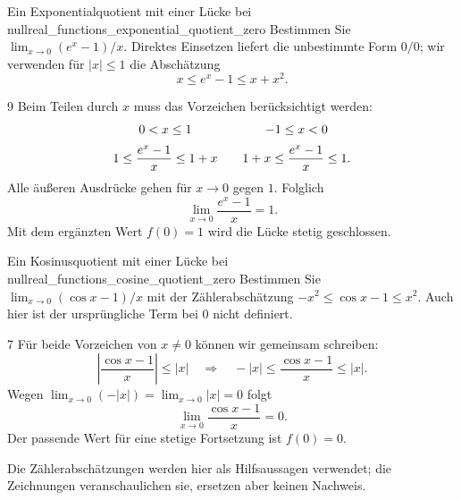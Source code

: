 \begin{ExampleBox}{Ein Exponentialquotient mit einer Lücke bei null}{real_functions_exponential_quotient_zero}
  Bestimmen Sie $\lim_{x\to0}(e^x-1)/x$. Direktes Einsetzen liefert
  die unbestimmte Form $0/0$; wir verwenden für $|x|\le1$ die Abschätzung
  \[
    x\le e^x-1\le x+x^2.
  \]
  \begin{center}
  \end{center}
  \begin{ClozeArea}[34]{9}
    Beim Teilen durch $x$ muss das Vorzeichen berücksichtigt werden:
    \[
      \begin{array}{c@{\qquad}c}
        0<x\le1&-1\le x<0\\[0.6em]
        1\le\dfrac{e^x-1}{x}\le1+x&
        1+x\le\dfrac{e^x-1}{x}\le1.
      \end{array}
    \]
    Alle äußeren Ausdrücke gehen für $x\to0$ gegen $1$. Folglich
    \[
      \lim_{x\to0}\frac{e^x-1}{x}=1.
    \]
    Mit dem ergänzten Wert $f(0)=1$ wird die Lücke stetig geschlossen.
  \end{ClozeArea}
\end{ExampleBox}
\begin{ExampleBox}{Ein Kosinusquotient mit einer Lücke bei null}{real_functions_cosine_quotient_zero}
  Bestimmen Sie $\lim_{x\to0}(\cos x-1)/x$ mit der Zählerabschätzung
  $-x^2\le\cos x-1\le x^2$. Auch hier ist der ursprüngliche Term bei $0$ nicht definiert.
  \begin{center}
  \end{center}
  \begin{ClozeArea}[34]{7}
    Für beide Vorzeichen von $x\ne0$ können wir gemeinsam schreiben:
    \[
      \left|\frac{\cos x-1}{x}\right|\le |x|
      \quad\Longrightarrow\quad
      -|x|\le\frac{\cos x-1}{x}\le |x|.
    \]
    Wegen $\lim_{x\to0}(-|x|)=\lim_{x\to0}|x|=0$ folgt
    \[
      \lim_{x\to0}\frac{\cos x-1}{x}=0.
    \]
    Der passende Wert für eine stetige Fortsetzung ist $f(0)=0$.
  \end{ClozeArea}
\end{ExampleBox}
Die Zählerabschätzungen werden hier als Hilfsaussagen verwendet;
die Zeichnungen veranschaulichen sie, ersetzen aber keinen Nachweis.
